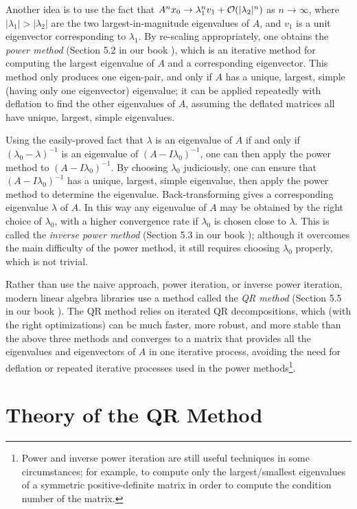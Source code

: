 \documentclass{article}
\begin{document}
Another idea is to use the fact that $A^nx_0 \to \lambda_1^nv_1 + \mathcal{O}(|\lambda_2|^n)$ as $n \to \infty$, where $|\lambda_1| > |\lambda_2|$ are the two largest-in-magnitude eigenvalues of $A$, and $v_1$ is a unit eigenvector corresponding to $\lambda_1$. By re-scaling appropriately, one obtains the \emph{power method} (Section 5.2 in our book \cite{ackleh_2009}), which is an iterative method for computing the largest eigenvalue of $A$ and a corresponding eigenvector. This method only produces one eigen-pair, and only if $A$ has a unique, largest, simple (having only one eigenvector) eigenvalue; it can be applied repeatedly with deflation to find the other eigenvalues of $A$, assuming the deflated matrices all have unique, largest, simple eigenvalues.

Using the easily-proved fact that $\lambda$ is an eigenvalue of $A$ if and only if $(\lambda_0 - \lambda)^{-1}$ is an eigenvalue of $(A-I\lambda_0)^{-1}$, one can then apply the power method to $(A-I\lambda_0)^{-1}$. By choosing $\lambda_0$ judiciously, one can ensure that $(A-I\lambda_0)^{-1}$ has a unique, largest, simple eigenvalue, then apply the power method to determine the eigenvalue. Back-transforming gives a corresponding eigenvalue $\lambda$ of $A$. In this way any eigenvalue of $A$ may be obtained by the right choice of $\lambda_0$, with a higher convergence rate if $\lambda_0$ is chosen close to $\lambda$. This is called the \emph{inverse power method} (Section 5.3 in our book \cite{ackleh_2009}); although it overcomes the main difficulty of the power method, it still requires choosing $\lambda_0$ properly, which is not trivial.

Rather than use the naive approach, power iteration, or inverse power iteration, modern linear algebra libraries use a method called the \emph{QR method} (Section 5.5 in our book \cite{ackleh_2009}). The QR method relies on iterated QR decompositions, which (with the right optimizations) can be much faster, more robust, and more stable than the above three methods and converges to a matrix that provides all the eigenvalues and eigenvectors of $A$ in one iterative process, avoiding the need for deflation or repeated iterative processes used in the power methods\footnote{Power and inverse power iteration are still useful techniques in some circumstances; for example, to compute only the largest/smallest eigenvalues of a symmetric positive-definite matrix in order to compute the condition number of the matrix.}. 

\section{Theory of the QR Method}
\end{document}
